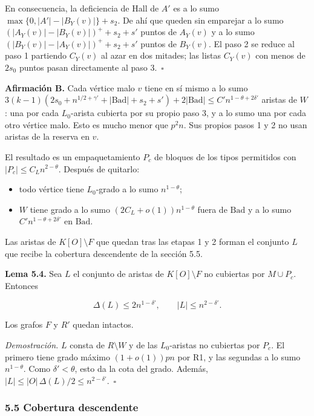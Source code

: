\documentclass[spanish,11pt,a4paper]{article}
\providecommand{\tightlist}{\setlength{\itemsep}{0pt}\setlength{\parskip}{0pt}}
\begin{document}
En consecuencia, la deficiencia de Hall de \(A'\) es a lo sumo \(\max\{0,|A'|-|B_Y(v)|\}+s_2\). De ahí que queden sin emparejar a lo sumo \((|A_Y(v)|-|B_Y(v)|)^++s_2+s'\) puntos de \(A_Y(v)\) y a lo sumo \((|B_Y(v)|-|A_Y(v)|)^++s_2+s'\) puntos de \(B_Y(v)\). El paso 2 se reduce al paso 1 partiendo \(C_Y(v)\) al azar en dos mitades; las listas \(C_Y(v)\) con menos de \(2s_0\) puntos pasan directamente al paso 3.~\(\square\)

\textbf{Afirmación B.} Cada vértice malo \(v\) tiene en sí mismo a lo sumo \(3(k-1)(2s_0+n^{1/2+\gamma'}+|\mathrm{Bad}|+s_2+s')+2|\mathrm{Bad}|\le C'n^{1-\theta+2\delta'}\) aristas de \(W\): una por cada \(L_0\)-arista cubierta por su propio paso 3, y a lo sumo una por cada otro vértice malo. Esto es mucho menor que \(p^2n\). Sus propios pasos 1 y 2 no usan aristas de la reserva en \(v\).

El resultado es un empaquetamiento \(P_c\) de bloques de los tipos permitidos con \(|P_c|\le C_Ln^{2-\theta}\). Después de quitarlo:

\begin{itemize}
\tightlist
\item
  todo vértice tiene \(L_0\)-grado a lo sumo \(n^{1-\theta}\);
\item
  \(W\) tiene grado a lo sumo \((2C_L+o(1))n^{1-\theta}\) fuera de \(\mathrm{Bad}\) y a lo sumo \(C'n^{1-\theta+2\delta'}\) en \(\mathrm{Bad}\).
\end{itemize}

Las aristas de \(K[O]\setminus F\) que quedan tras las etapas 1 y 2 forman el conjunto \(L\) que recibe la cobertura descendente de la sección 5.5.

\textbf{Lema 5.4.} Sea \(L\) el conjunto de aristas de \(K[O]\setminus F\) no cubiertas por \(M\cup P_c\). Entonces

\nopagebreak[4]
\[\Delta(L)\le2n^{1-\delta'},\qquad|L|\le n^{2-\delta'}.\]

Los grafos \(F\) y \(R'\) quedan intactos.

\emph{Demostración.} \(L\) consta de \(R\setminus W\) y de las \(L_0\)-aristas no cubiertas por \(P_c\). El primero tiene grado máximo \((1+o(1))pn\) por R1, y las segundas a lo sumo \(n^{1-\theta}\). Como \(\delta'<\theta\), esto da la cota del grado. Además, \(|L|\le|O|\,\Delta(L)/2\le n^{2-\delta'}\).~\(\square\)

\subsubsection{5.5 Cobertura descendente}\label{cobertura-descendente}
\end{document}
